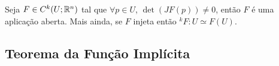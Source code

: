                 
\- \vspace{-2cm}

\begin{corollary}
    Seja \(F \in C^k(U;\mathbb{R}^n)\) tal que \(\forall p \in U\), \(\det(JF(p))\neq 0\), então \(F\) é uma aplicação aberta. Mais ainda, se \(F\) injeta então \(^k F: U \simeq F(U)\). 
\end{corollary}

\subsection{Teorema da Função Implícita}



